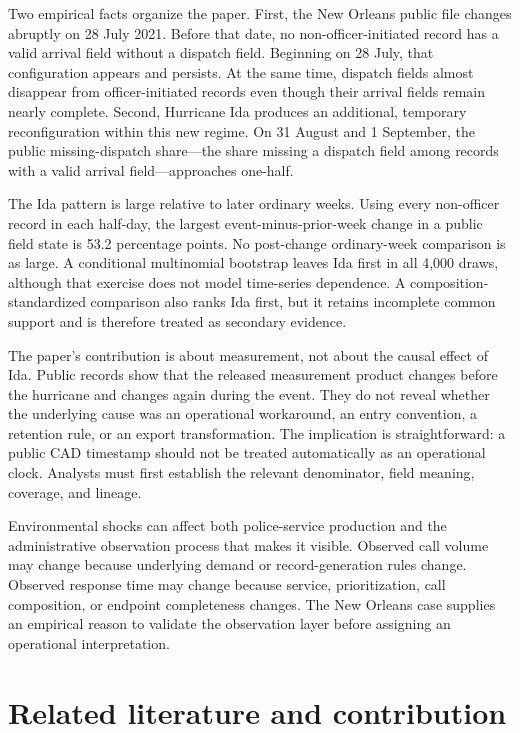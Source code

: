 \documentclass[11pt]{article}
\begin{document}
Two empirical facts organize the paper. First, the New Orleans public file changes abruptly on 28 July 2021. Before that date, no non-officer-initiated record has a valid arrival field without a dispatch field. Beginning on 28 July, that configuration appears and persists. At the same time, dispatch fields almost disappear from officer-initiated records even though their arrival fields remain nearly complete. Second, Hurricane Ida produces an additional, temporary reconfiguration within this new regime. On 31 August and 1 September, the public missing-dispatch share---the share missing a dispatch field among records with a valid arrival field---approaches one-half.

The Ida pattern is large relative to later ordinary weeks. Using every non-officer record in each half-day, the largest event-minus-prior-week change in a public field state is 53.2 percentage points. No post-change ordinary-week comparison is as large. A conditional multinomial bootstrap leaves Ida first in all 4,000 draws, although that exercise does not model time-series dependence. A composition-standardized comparison also ranks Ida first, but it retains incomplete common support and is therefore treated as secondary evidence.

The paper's contribution is about measurement, not about the causal effect of Ida. Public records show that the released measurement product changes before the hurricane and changes again during the event. They do not reveal whether the underlying cause was an operational workaround, an entry convention, a retention rule, or an export transformation. The implication is straightforward: a public CAD timestamp should not be treated automatically as an operational clock. Analysts must first establish the relevant denominator, field meaning, coverage, and lineage.

Environmental shocks can affect both police-service production and the administrative observation process that makes it visible. Observed call volume may change because underlying demand or record-generation rules change. Observed response time may change because service, prioritization, call composition, or endpoint completeness changes. The New Orleans case supplies an empirical reason to validate the observation layer before assigning an operational interpretation.

\section{Related literature and contribution}
\end{document}
